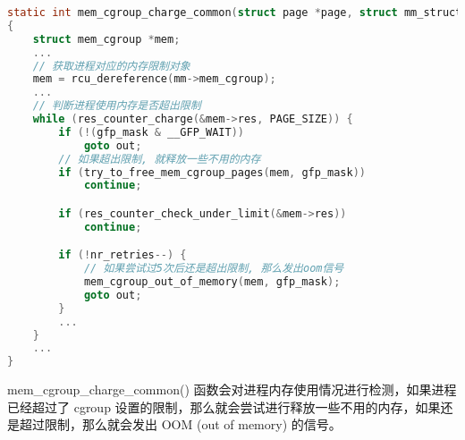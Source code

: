 \documentclass[../../../interview-questions.tex]{subfiles}
\begin{document}
\begin{lstlisting}[language=C]
static int mem_cgroup_charge_common(struct page *page, struct mm_struct *mm, gfp_t gfp_mask, enum charge_type ctype)
{
    struct mem_cgroup *mem;
    ...
    // 获取进程对应的内存限制对象
    mem = rcu_dereference(mm->mem_cgroup); 
    ...
    // 判断进程使用内存是否超出限制
    while (res_counter_charge(&mem->res, PAGE_SIZE)) { 
        if (!(gfp_mask & __GFP_WAIT))
            goto out;
        // 如果超出限制, 就释放一些不用的内存
        if (try_to_free_mem_cgroup_pages(mem, gfp_mask)) 
            continue;

        if (res_counter_check_under_limit(&mem->res))
            continue;

        if (!nr_retries--) {
            // 如果尝试过5次后还是超出限制, 那么发出oom信号
            mem_cgroup_out_of_memory(mem, gfp_mask); 
            goto out;
        }
        ...
    }
    ...
}
\end{lstlisting}

mem\_cgroup\_charge\_common() 函数会对进程内存使用情况进行检测，如果进程已经超过了 cgroup 设置的限制，那么就会尝试进行释放一些不用的内存，如果还是超过限制，那么就会发出 OOM (out of memory) 的信号。
\end{document}
